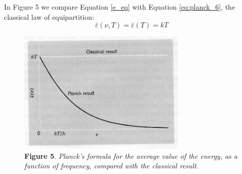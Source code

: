 In Figure 5 we compare Equation \eqref{e_eq} with Equation \eqref{eq:planck_6}, the classical law of
equipartition:
%
\begin{equation*}\tag{6}
\bar{\varepsilon}(\nu, T) = \bar{\varepsilon}(T) = kT %
\end{equation*}
%
%
\begin{figure}[h]
\centering
  \captionsetup{width=4.15625in}
  \includegraphics[width=3.15625in,height=2.30208in]{images/05_planck/image028.jpg}
  \caption*{\textbf{Figure 5}. \emph{Planck's formula for the average value of the energy,
    as a function of frequency, compared with the classical result.}}
\end{figure}
%
